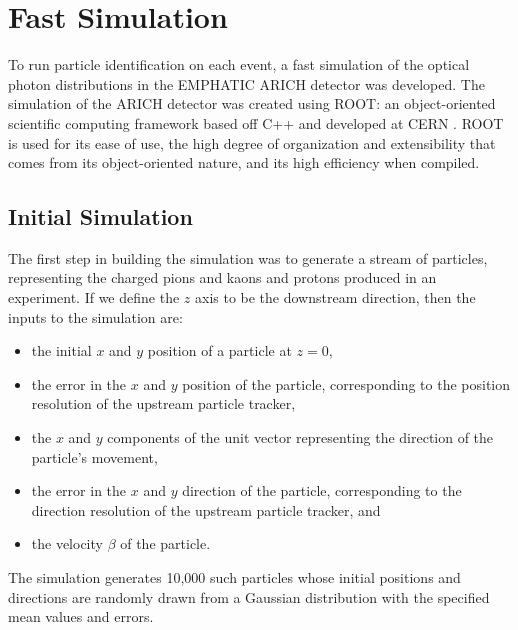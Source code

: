 
\chapter{Fast Simulation}
\label{ch:Methods}
To run particle identification on each event, a fast simulation of the optical photon distributions in the EMPHATIC ARICH detector was developed.
The simulation of the ARICH detector was created using \textsc{ROOT}: an object-oriented scientific computing framework based off C++ and developed at CERN \cite{root}.
\textsc{ROOT} is used for its ease of use, the high degree of organization and extensibility that comes from its object-oriented nature, and its high efficiency when compiled.

\section{Initial Simulation}
\label{sec:experiment}
The first step in building the simulation was to generate a stream of particles, representing the charged pions and kaons and protons produced in an experiment.
If we define the $z$ axis to be the downstream direction, then the inputs to the simulation are:
\begin{itemize}
\item the initial $x$ and $y$ position of a particle at $z=0$,
\item the error in the $x$ and $y$ position of the particle, corresponding to the position resolution of the upstream particle tracker,
\item the $x$ and $y$ components of the unit vector representing the direction of the particle's movement,
\item the error in the $x$ and $y$ direction of the particle, corresponding to the direction resolution of the upstream particle tracker, and
\item the velocity $\beta$ of the particle.
\end{itemize} 
The simulation generates 10,000 such particles whose initial positions and directions are randomly drawn from a Gaussian distribution with the specified mean values and errors.

